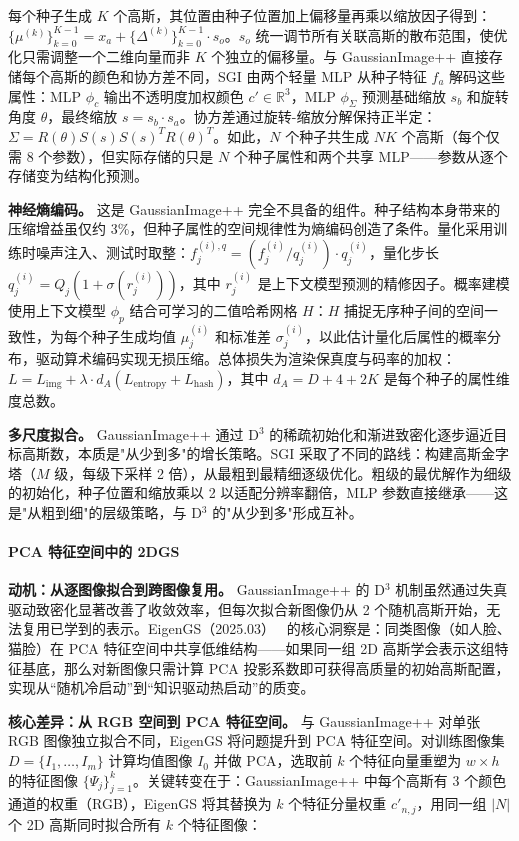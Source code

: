 每个种子生成 $K$ 个高斯，其位置由种子位置加上偏移量再乘以缩放因子得到：$\{\mu^{(k)}\}_{k=0}^{K-1} = x_a + \{\Delta^{(k)}\}_{k=0}^{K-1} \cdot s_o$。$s_o$ 统一调节所有关联高斯的散布范围，使优化只需调整一个二维向量而非 $K$ 个独立的偏移量。与 GaussianImage++ 直接存储每个高斯的颜色和协方差不同，SGI 由两个轻量 MLP 从种子特征 $f_a$ 解码这些属性：MLP $\phi_c$ 输出不透明度加权颜色 $c' \in \mathbb{R}^3$，MLP $\phi_\Sigma$ 预测基础缩放 $s_b$ 和旋转角度 $\theta$，最终缩放 $s = s_b \cdot s_a$。协方差通过旋转-缩放分解保持正半定：$\Sigma = R(\theta) S(s) S(s)^T R(\theta)^T$。如此，$N$ 个种子共生成 $NK$ 个高斯（每个仅需 8 个参数），但实际存储的只是 $N$ 个种子属性和两个共享 MLP——参数从逐个存储变为结构化预测。

\textbf{神经熵编码。} 这是 GaussianImage++ 完全不具备的组件。种子结构本身带来的压缩增益虽仅约 3\%，但种子属性的空间规律性为熵编码创造了条件。量化采用训练时噪声注入、测试时取整：$f_j^{(i),q} = (f_j^{(i)} / q_j^{(i)}) \cdot q_j^{(i)}$，量化步长 $q_j^{(i)} = Q_j(1 + \sigma(r_j^{(i)}))$，其中 $r_j^{(i)}$ 是上下文模型预测的精修因子。概率建模使用上下文模型 $\phi_p$ 结合可学习的二值哈希网格 $H$：$H$ 捕捉无序种子间的空间一致性，为每个种子生成均值 $\mu_j^{(i)}$ 和标准差 $\sigma_j^{(i)}$，以此估计量化后属性的概率分布，驱动算术编码实现无损压缩。总体损失为渲染保真度与码率的加权：$L = L_\text{img} + \lambda \cdot d_A(L_\text{entropy} + L_\text{hash})$，其中 $d_A = D + 4 + 2K$ 是每个种子的属性维度总数。

\textbf{多尺度拟合。} GaussianImage++ 通过 D$^3$ 的稀疏初始化和渐进致密化逐步逼近目标高斯数，本质是"从少到多"的增长策略。SGI 采取了不同的路线：构建高斯金字塔（$M$ 级，每级下采样 2 倍），从最粗到最精细逐级优化。粗级的最优解作为细级的初始化，种子位置和缩放乘以 2 以适配分辨率翻倍，MLP 参数直接继承——这是"从粗到细"的层级策略，与 D$^3$ 的"从少到多"形成互补。

\paragraph{PCA 特征空间中的 2DGS}

\textbf{动机：从逐图像拟合到跨图像复用。} GaussianImage++ 的 D$^3$ 机制虽然通过失真驱动致密化显著改善了收敛效率，但每次拟合新图像仍从 2 个随机高斯开始，无法复用已学到的表示。EigenGS（2025.03）~\cite{2503_07446} 的核心洞察是：同类图像（如人脸、猫脸）在 PCA 特征空间中共享低维结构——如果同一组 2D 高斯学会表示这组特征基底，那么对新图像只需计算 PCA 投影系数即可获得高质量的初始高斯配置，实现从``随机冷启动''到``知识驱动热启动''的质变。

\textbf{核心差异：从 RGB 空间到 PCA 特征空间。} 与 GaussianImage++ 对单张 RGB 图像独立拟合不同，EigenGS 将问题提升到 PCA 特征空间。对训练图像集 $D = \{I_1, \dots, I_m\}$ 计算均值图像 $I_0$ 并做 PCA，选取前 $k$ 个特征向量重塑为 $w \times h$ 的特征图像 $\{\Psi_j\}_{j=1}^k$。关键转变在于：GaussianImage++ 中每个高斯有 3 个颜色通道的权重（RGB），EigenGS 将其替换为 $k$ 个特征分量权重 $c'_{n,j}$，用同一组 $|N|$ 个 2D 高斯同时拟合所有 $k$ 个特征图像：


